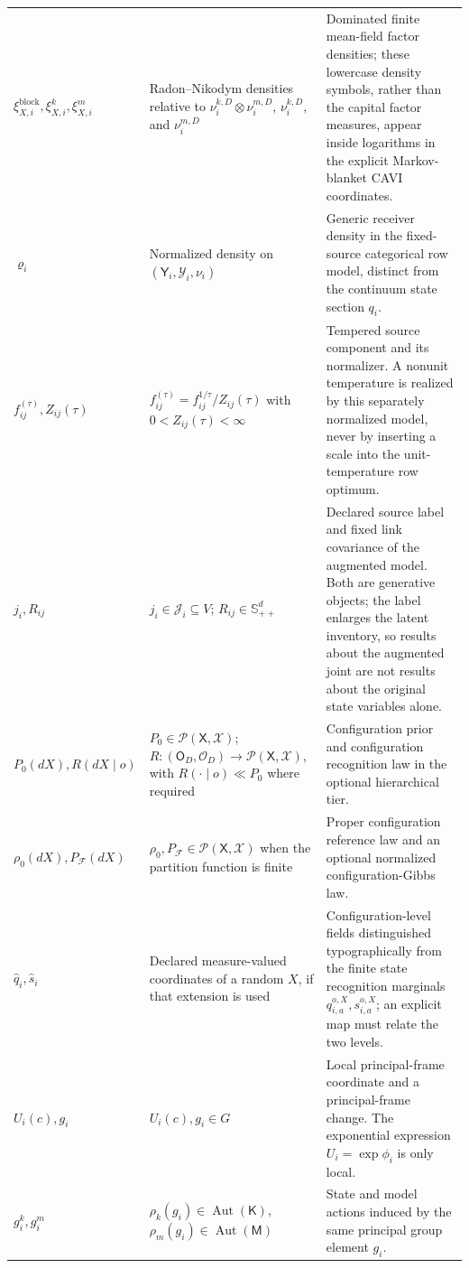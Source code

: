 \begin{longtable}{>{\raggedright\arraybackslash}p{}>{\raggedright\arraybackslash}p{}>{\raggedright\arraybackslash}p{}}
\(\xi^{\mathrm{block}}_{X,i},\xi^k_{X,i},\xi^m_{X,i}\) &
Radon--Nikodym densities relative to \(\nu_i^{k,D}\otimes\nu_i^{m,D}\), \(\nu_i^{k,D}\), and \(\nu_i^{m,D}\) &
Dominated finite mean-field factor densities; these lowercase density symbols, rather than the capital factor measures, appear inside logarithms in the explicit Markov-blanket CAVI coordinates.\\
\(\varrho_i\) &
Normalized density on \((\mathsf Y_i,\mathscr Y_i,\nu_i)\) &
Generic receiver density in the fixed-source categorical row model, distinct from the continuum state section \(q_i\).\\
\(f_{ij}^{(\tau)},Z_{ij}(\tau)\) &
\(f_{ij}^{(\tau)}=f_{ij}^{1/\tau}/Z_{ij}(\tau)\) with \(0<Z_{ij}(\tau)<\infty\) &
Tempered source component and its normalizer. A nonunit temperature is realized by this separately normalized model, never by inserting a scale into the unit-temperature row optimum.\\
\(j_i,R_{ij}\) &
\(j_i\in\mathcal J_i\subseteq V\); \(R_{ij}\in\mathbb S_{++}^{d}\) &
Declared source label and fixed link covariance of the augmented model. Both are generative objects; the label enlarges the latent inventory, so results about the augmented joint are not results about the original state variables alone.\\
\(P_0(dX),R(dX\mid o)\) &
\(P_0\in\mathcal P(\mathsf X,\mathscr X)\); \(R:(\mathsf O_D,\mathscr O_D)\to\mathcal P(\mathsf X,\mathscr X)\), with \(R(\mathord\cdot\mid o)\ll P_0\) where required &
Configuration prior and configuration recognition law in the optional hierarchical tier.\\
\(\rho_0(dX),P_{\mathcal F}(dX)\) &
\(\rho_0,P_{\mathcal F}\in\mathcal P(\mathsf X,\mathscr X)\) when the partition function is finite &
Proper configuration reference law and an optional normalized configuration-Gibbs law.\\
\(\widehat q_i,\widehat s_i\) &
Declared measure-valued coordinates of a random \(X\), if that extension is used &
Configuration-level fields distinguished typographically from the finite state recognition marginals \(q_{i,a}^{o,X},s_{i,a}^{o,X}\); an explicit map must relate the two levels.\\
\(U_i(c),g_i\) &
\(U_i(c),g_i\in G\) &
Local principal-frame coordinate and a principal-frame change. The exponential expression \(U_i=\exp\phi_i\) is only local.\\
\(g_i^k,g_i^m\) &
\(\rho_k(g_i)\in\operatorname{Aut}(\mathsf K)\), \(\rho_m(g_i)\in\operatorname{Aut}(\mathsf M)\) &
State and model actions induced by the same principal group element \(g_i\).\\

\end{longtable}
